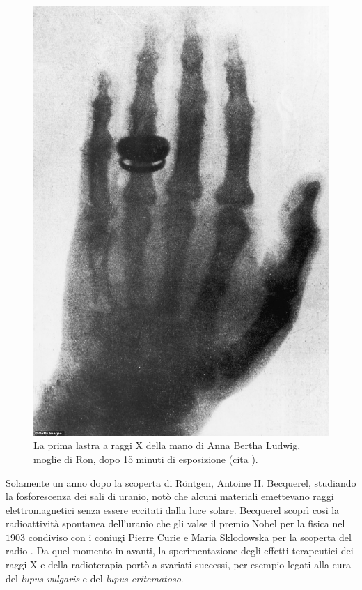 \documentclass[12pt,a4paper,twoside]{report}
\begin{document}
	\begin{figure}[H]
		\centering
		\includegraphics[width=0.9\linewidth]{images/rongten.jpg}
		\caption{La prima lastra a raggi X della mano di Anna Bertha Ludwig, moglie di Ron, dopo 15 minuti di esposizione (cita
			).}
		\label{fig:rongten}
	\end{figure}
	
	Solamente un anno dopo la scoperta di Röntgen, Antoine H. Becquerel, studiando la fosforescenza dei sali di uranio, notò che alcuni materiali emettevano raggi elettromagnetici senza essere eccitati dalla luce solare. Becquerel scoprì così la radioattività spontanea dell'uranio che gli valse il premio Nobel per la fisica nel $1903$ condiviso con i coniugi Pierre Curie e Maria Sklodowska per la scoperta del radio . Da quel momento in avanti, la sperimentazione degli effetti terapeutici dei raggi X e della radioterapia portò a svariati successi, per esempio legati alla cura del \textit{lupus vulgaris} e del \textit{lupus eritematoso}.
	
\end{document}
